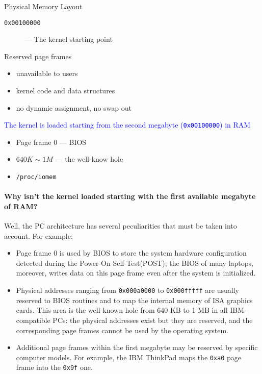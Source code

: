 \begin{frame}{Physical Memory Layout}
  \begin{description}
  \item[\texttt{0x00100000}]--- The kernel starting point
  \end{description}
  \begin{varwidth}{.49\textwidth}
    \begin{block}{Reserved page frames}
      \begin{itemize}
      \item unavailable to users
      \item kernel code and data structures
      \item no dynamic assignment, no swap out
      \end{itemize}
    \end{block}
    \textcolor{blue}{The kernel is loaded starting from the second megabyte (\texttt{0x00100000})
      in RAM}
    \begin{itemize}
    \item Page frame 0 --- BIOS
    \item $640K\sim{}1M$ --- the well-know hole
    \item \texttt{/proc/iomem}
    \end{itemize}
  \end{varwidth}\hfill
  \begin{varwidth}{.49\textwidth}
    \mode<beamer>{
      \texttt{[image: boot-mem]}
    } 
  \end{varwidth}
\end{frame}

\paragraph{Why isn't the kernel loaded starting with the first available megabyte of RAM?}

 Well, the PC architecture has
several peculiarities that must be taken into account. For example:

\begin{itemize}
\item Page frame 0 is used by BIOS to store the system hardware configuration detected
  during the Power-On Self-Test(POST); the BIOS of many laptops, moreover, writes data on
  this page frame even after the system is initialized.
\item Physical addresses ranging from \texttt{0x000a0000} to \texttt{0x000fffff} are usually
  reserved to BIOS routines and to map the internal memory of ISA graphics cards. This
  area is the well-known hole from 640 KB to 1 MB in all IBM-compatible PCs: the physical
  addresses exist but they are reserved, and the corresponding page frames cannot be used
  by the operating system.
\item Additional page frames within the first megabyte may be reserved by specific
  computer models. For example, the IBM ThinkPad maps the \texttt{0xa0} page frame into
  the \texttt{0x9f} one.
\end{itemize}

